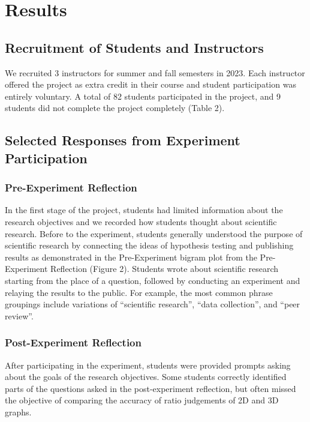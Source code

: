 \documentclass[
  12pt,
]{article}
\begin{document}
\section{Results}\label{results}

\subsection{Recruitment of Students and
Instructors}\label{recruitment-of-students-and-instructors}

We recruited 3 instructors for summer and fall semesters in 2023. Each
instructor offered the project as extra credit in their course and
student participation was entirely voluntary. A total of 82 students
participated in the project, and 9 students did not complete the project
completely (Table 2).

\subsection{Selected Responses from Experiment
Participation}\label{selected-responses-from-experiment-participation}

\subsubsection{Pre-Experiment
Reflection}\label{pre-experiment-reflection}

In the first stage of the project, students had limited information
about the research objectives and we recorded how students thought about
scientific research. Before to the experiment, students generally
understood the purpose of scientific research by connecting the ideas of
hypothesis testing and publishing results as demonstrated in the
Pre-Experiment bigram plot from the Pre-Experiment Reflection (Figure
2). Students wrote about scientific research starting from the place of
a question, followed by conducting an experiment and relaying the
results to the public. For example, the most common phrase groupings
include variations of ``scientific research'', ``data collection'', and
``peer review''.

\subsubsection{Post-Experiment
Reflection}\label{post-experiment-reflection}

After participating in the experiment, students were provided prompts
asking about the goals of the research objectives. Some students
correctly identified parts of the questions asked in the post-experiment
reflection, but often missed the objective of comparing the accuracy of
ratio judgements of 2D and 3D graphs.
\end{document}
